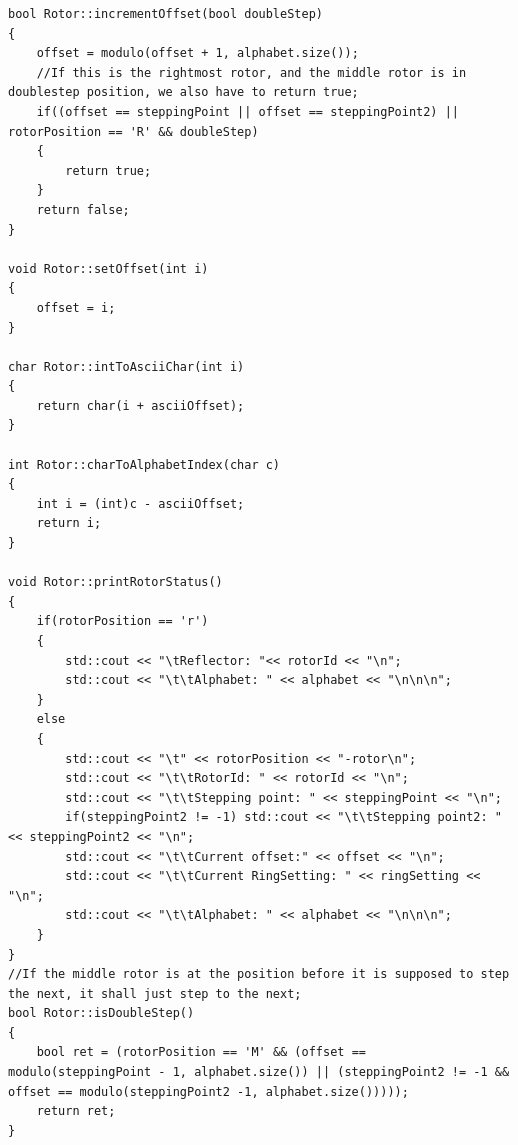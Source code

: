 \documentclass{article}
\begin{document}
\begin{lstlisting}
bool Rotor::incrementOffset(bool doubleStep)
{
	offset = modulo(offset + 1, alphabet.size());
	//If this is the rightmost rotor, and the middle rotor is in doublestep position, we also have to return true;
	if((offset == steppingPoint || offset == steppingPoint2) || rotorPosition == 'R' && doubleStep) 
	{
		return true;
	}
	return false;
}

void Rotor::setOffset(int i)
{
	offset = i;
}

char Rotor::intToAsciiChar(int i)
{
	return char(i + asciiOffset);
}

int Rotor::charToAlphabetIndex(char c)
{
	int i = (int)c - asciiOffset;
	return i;
}

void Rotor::printRotorStatus()
{
	if(rotorPosition == 'r')
	{
		std::cout << "\tReflector: "<< rotorId << "\n";
		std::cout << "\t\tAlphabet: " << alphabet << "\n\n\n";
	}
	else
	{
		std::cout << "\t" << rotorPosition << "-rotor\n";
		std::cout << "\t\tRotorId: " << rotorId << "\n";
		std::cout << "\t\tStepping point: " << steppingPoint << "\n";
		if(steppingPoint2 != -1) std::cout << "\t\tStepping point2: " << steppingPoint2 << "\n";
		std::cout << "\t\tCurrent offset:" << offset << "\n";
		std::cout << "\t\tCurrent RingSetting: " << ringSetting << "\n";
		std::cout << "\t\tAlphabet: " << alphabet << "\n\n\n";
	}
}
//If the middle rotor is at the position before it is supposed to step the next, it shall just step to the next;
bool Rotor::isDoubleStep()
{
	bool ret = (rotorPosition == 'M' && (offset == modulo(steppingPoint - 1, alphabet.size()) || (steppingPoint2 != -1 && offset == modulo(steppingPoint2 -1, alphabet.size()))));
	return ret;
}
\end{lstlisting}

\newpage

\nocite{*}



\end{document}
